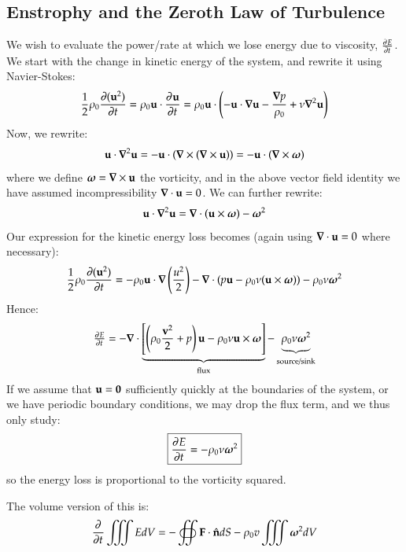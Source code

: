 \subsection{Enstrophy and the Zeroth Law of Turbulence}
We wish to evaluate the power/rate at which we lose energy due to viscosity, $\pd{E}{t}$. We start with the change in kinetic energy of the system, and rewrite it using Navier-Stokes:
\begin{equation}
    \frac{1}{2}\rho_0\frac{\partial(\v{u}^2)}{\partial t} = \rho_0 \v{u}\cdot \dpd{\v{u}}{t} = \rho_0 \v{u}\cdot\left(-\v{u}\cdot\nabla\v{u} - \frac{\nabla p}{\rho_0} + \nu\nabla^2\v{u}\right)
\end{equation}
Now, we rewrite:
\begin{equation}
    \v{u} \cdot \nabla^2 \v{u} = -\v{u} \cdot (\nabla \times (\nabla \times \v{u})) = -\v{u} \cdot (\nabla \times \gv{\omega})
\end{equation}
where we define $\gv{\omega} = \nabla \times \v{u}$ the vorticity, and in the above vector field identity we have assumed incompressibility $\nabla \cdot \v{u} = 0$. We can further rewrite:
\begin{equation}
    \v{u} \cdot \nabla^2\v{u} = \nabla\cdot(\v{u} \times \gv{\omega}) - \gv{\omega}^2
\end{equation}
Our expression for the kinetic energy loss becomes (again using $\nabla \cdot \v{u} = 0$ where necessary):
\begin{equation}
    \frac{1}{2}\rho_0\frac{\partial(\v{u}^2)}{\partial t} = -\rho_0 \v{u} \cdot \nabla\left(\frac{u^2}{2}\right) - \nabla \cdot (p\v{u} - \rho_0 \nu(\v{u} \times \gv{\omega})) - \rho_0 \nu\gv{\omega}^2
\end{equation}
Hence:
\begin{equation}
    \pd{E}{t} = -\nabla\cdot\underbrace{\left[\left(\rho_0\frac{\v{v}^2}{2} + p\right)\v{u} - \rho_0\nu \v{u} \times \gv{\omega}\right]}_{\text{flux}} - \underbrace{\rho_0 \nu \gv{\omega}^2}_{\text{source/sink}}
\end{equation}
If we assume that $\mathbf{u} = \mathbf{0}$ sufficiently quickly at the boundaries of the system, or we have periodic boundary conditions, we may drop the flux term, and we thus only study:
\begin{equation}
    \boxed{\dpd{E}{t} = -\rho_0 \nu\gv{\omega}^2}
\end{equation}
so the energy loss is proportional to the vorticity squared.

The volume version of this is:
\begin{equation}
    \dpd{}{t}\iiint E dV = -\oiint \v{F} \cdot \hat{\v{n}}dS - \rho_0v \iiint \gv{\omega}^2 dV
\end{equation}

